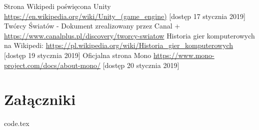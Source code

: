 \documentclass[a4paper,12pt,twoside,openany]{report}
\begin{document}
\begin{thebibliography}{99}
 {Strona Wikipedi poświęcona Unity  \url{https://en.wikipedia.org/wiki/Unity_(game_engine)} [dostęp 17 stycznia 2019]}
 {Twórcy Światów - Dokument zrealizowany przez Canal + \url{https://www.canalplus.pl/discovery/tworcy-swiatow}}
 {Historia gier komputerowych na Wikipedi: \url{https://pl.wikipedia.org/wiki/Historia_gier_komputerowych} [dostęp 19 stycznia 2019]}
 {Oficjalna strona Mono \url{https://www.mono-project.com/docs/about-mono/} [dostęp 20 stycznia 2019]}

\end{thebibliography}

\listoffigures
 
\listoftables

\appendix
\chapter{Załączniki}
     {code.tex}

\end{document}
